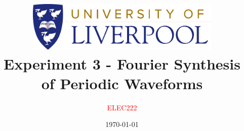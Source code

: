 \title{
  \includegraphics[width=0.7\textwidth]{titlepage/LivUniCrest.pdf} \\
  \vspace{20pt}
  Experiment 3 - Fourier Synthesis of Periodic Waveforms
}
\author{
  \textcolor{red}{ELEC222}
}
\date{\today}

\lstset{
  style      = Matlab-editor,
  basicstyle = \footnotesize\mlttfamily  %
}

\setlength{\parindent}{0pt}
\setlength{\parskip}{9pt plus 4pt minus 2pt}
